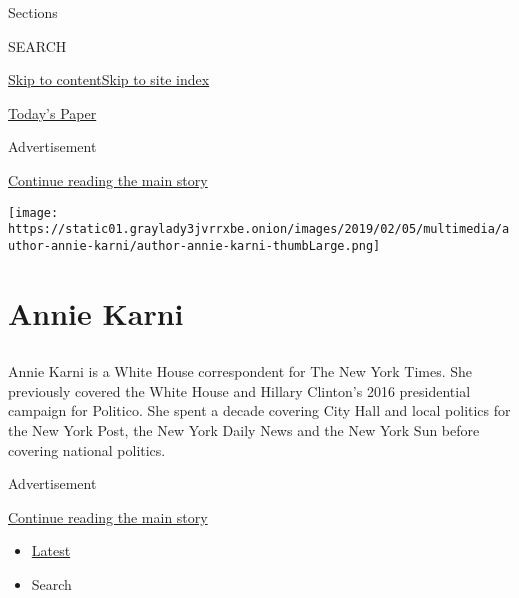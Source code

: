Sections

SEARCH

\protect\hyperlink{site-content}{Skip to
content}\protect\hyperlink{site-index}{Skip to site index}

\href{https://myaccount.nytimes3xbfgragh.onion/auth/login?response_type=cookie\&client_id=vi}{}

\href{https://www.nytimes3xbfgragh.onion/section/todayspaper}{Today's
Paper}

Advertisement

\protect\hyperlink{after-top}{Continue reading the main story}

\texttt{[image: https://static01.graylady3jvrrxbe.onion/images/2019/02/05/multimedia/author-annie-karni/author-annie-karni-thumbLarge.png]}

\hypertarget{annie-karni}{%
\section{Annie Karni}\label{annie-karni}}

\subsection{}

Annie Karni is a White House correspondent for The New York Times. She
previously covered the White House and Hillary Clinton's 2016
presidential campaign for Politico. She spent a decade covering City
Hall and local politics for the New York Post, the New York Daily News
and the New York Sun before covering national politics.

Advertisement

\protect\hyperlink{after-mid1}{Continue reading the main story}

\begin{itemize}
\tightlist
\item
  \protect\hyperlink{stream-panel}{Latest}
\item
  Search
\end{itemize}

